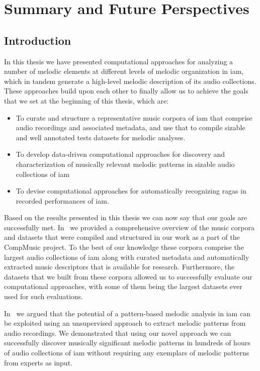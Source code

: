 
\chapter{Summary and Future Perspectives}
\label{chap:summary_future_work}

\section{Introduction}
\label{sec:summary_thesis}

 In this thesis we have presented computational approaches for analyzing a number of melodic elements at different levels of melodic organization in \gls{iam}, which in tandem generate a high-level melodic description of its audio collections. These approaches build upon each other to finally allow us to achieve the goals that we set at the beginning of this thesis, which are: 
 
 \begin{itemize}
 	\item To curate and structure a representative music corpora of \gls{iam} that comprise audio recordings and associated metadata, and use that to compile sizable and well annotated tests datasets for melodic analyses.
 	\item To develop data-driven computational approaches for discovery and characterization of musically relevant melodic patterns in sizable audio collections of \gls{iam}
 	\item To devise computational approaches for automatically recognizing \glspl{raga} in recorded performances of \gls{iam}.
 \end{itemize}
 
 Based on the results presented in this thesis we can now say that our goals are successfully met. In~ we provided a comprehensive overview of the music corpora and datasets that were compiled and structured in our work as a part of the CompMusic project. To the best of our knowledge these corpora comprise the largest audio collections of \gls{iam} along with curated metadata and automatically extracted music descriptors that is available for research. Furthermore, the datasets that we built from these corpora allowed us to successfully evaluate our computational approaches, with some of them being the largest datasets ever used for such evaluations. 
 
 In~ we argued that the potential of a pattern-based melodic analysis in \gls{iam} can be exploited using an unsupervised approach to extract melodic patterns from audio recordings. We demonstrated that using our novel approach we can successfully discover musically significant melodic patterns in hundreds of hours of audio collections of \gls{iam} without requiring any exemplars of melodic patterns from experts as input.
 
